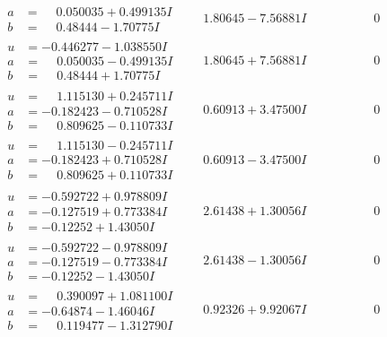 \documentclass[1p]{elsarticle_modified}
\theoremstyle{definition}
\begin{document}
$$\begin{array}{c|c|c}
\begin{aligned}
a &= \phantom{-}0.050035 + 0.499135 I \\
b &= \phantom{-}0.48444 - 1.70775 I\end{aligned}
 & \phantom{-}1.80645 - 7.56881 I & \phantom{-0.000000 } 0 \\ \hline\begin{aligned}
u &= -0.446277 - 1.038550 I \\
a &= \phantom{-}0.050035 - 0.499135 I \\
b &= \phantom{-}0.48444 + 1.70775 I\end{aligned}
 & \phantom{-}1.80645 + 7.56881 I & \phantom{-0.000000 } 0 \\ \hline\begin{aligned}
u &= \phantom{-}1.115130 + 0.245711 I \\
a &= -0.182423 - 0.710528 I \\
b &= \phantom{-}0.809625 - 0.110733 I\end{aligned}
 & \phantom{-}0.60913 + 3.47500 I & \phantom{-0.000000 } 0 \\ \hline\begin{aligned}
u &= \phantom{-}1.115130 - 0.245711 I \\
a &= -0.182423 + 0.710528 I \\
b &= \phantom{-}0.809625 + 0.110733 I\end{aligned}
 & \phantom{-}0.60913 - 3.47500 I & \phantom{-0.000000 } 0 \\ \hline\begin{aligned}
u &= -0.592722 + 0.978809 I \\
a &= -0.127519 + 0.773384 I \\
b &= -0.12252 + 1.43050 I\end{aligned}
 & \phantom{-}2.61438 + 1.30056 I & \phantom{-0.000000 } 0 \\ \hline\begin{aligned}
u &= -0.592722 - 0.978809 I \\
a &= -0.127519 - 0.773384 I \\
b &= -0.12252 - 1.43050 I\end{aligned}
 & \phantom{-}2.61438 - 1.30056 I & \phantom{-0.000000 } 0 \\ \hline\begin{aligned}
u &= \phantom{-}0.390097 + 1.081100 I \\
a &= -0.64874 - 1.46046 I \\
b &= \phantom{-}0.119477 - 1.312790 I\end{aligned}
 & \phantom{-}0.92326 + 9.92067 I & \phantom{-0.000000 } 0 \\ \hline\begin{aligned}

\end{aligned}
\end{array}$$
\end{document}
